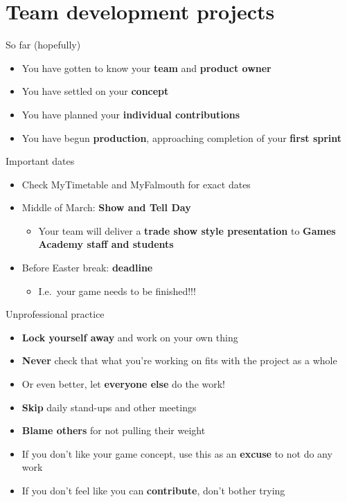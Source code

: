 \part{Team development projects}
\frame{\partpage}

\begin{frame}{So far (hopefully)}
	\begin{itemize}
		\pause\item You have gotten to know your \textbf{team} and \textbf{product owner}
		\pause\item You have settled on your \textbf{concept}
		\pause\item You have planned your \textbf{individual contributions}
		\pause\item You have begun \textbf{production}, approaching completion of your \textbf{first sprint}
	\end{itemize}
\end{frame}

\begin{frame}{Important dates}
	\begin{itemize}
		\pause\item Check MyTimetable and MyFalmouth for exact dates
		\pause\item Middle of March: \textbf{Show and Tell Day}
			\begin{itemize}
				\pause\item Your team will deliver a \textbf{trade show style presentation} to \textbf{Games Academy staff and students}
			\end{itemize}
		\pause\item Before Easter break: \textbf{deadline}
			\begin{itemize}
				\pause\item I.e.\ your game needs to be finished!!!
			\end{itemize}
	\end{itemize}
\end{frame}

\begin{frame}{Unprofessional practice}
	\begin{itemize}
		\pause\item \textbf{Lock yourself away} and work on your own thing
		\pause\item \textbf{Never} check that what you're working on fits with the project as a whole
		\pause\item Or even better, let \textbf{everyone else} do the work!
		\pause\item \textbf{Skip} daily stand-ups and other meetings
		\pause\item \textbf{Blame others} for not pulling their weight
		\pause\item If you don't like your game concept, use this as an \textbf{excuse} to not do any work
		\pause\item If you don't feel like you can \textbf{contribute}, don't bother trying
	\end{itemize}
\end{frame}

